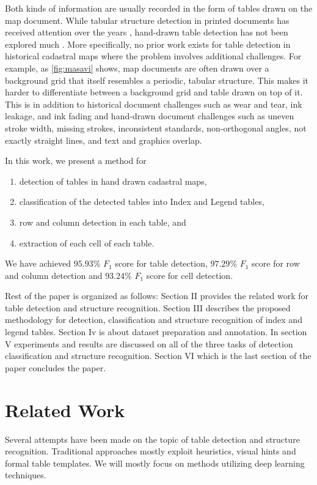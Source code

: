 Both kinds of information are usually recorded in the form of tables drawn on the map document. While tabular structure detection in printed documents has received attention over the years \cite{paliwal2019tablenet,qasim2019rethinking,khan2019table,kavasidis2019saliency,siddiqui2018decnt,arif2018table,schreiber2017deepdesrt,he2017multi,gilani2017table,shigarov2016configurable,kasar2015table,kasar2013learning,wang2004table,wangt2001automatic,kieninger1998t}, hand-drawn table detection has not been explored much \cite{ghanmi2014table,chen2012model,chen2011table}. More specifically, no prior work exists for table detection in historical cadastral maps where the problem involves additional challenges. For example, as \autoref{fig:masavi} shows, map documents are often drawn over a background grid that itself resembles a periodic, tabular structure. This makes  it harder to differentiate between a background grid and table drawn on top of it. This is in addition to historical document challenges such as wear and tear, ink leakage, and ink fading and hand-drawn document challenges such as uneven stroke width, missing strokes, inconsistent standards, non-orthogonal angles, not exactly straight lines, and text and graphics overlap.

In this work, we present a method for
\begin{enumerate}
      \item detection of tables in hand drawn cadastral maps,
      \item classification of the detected tables into Index and Legend tables,
      \item row and column detection in each table, and
      \item extraction of each cell of each table. 
\end{enumerate}
We have achieved $95.93\%$ $F_1$ score for table detection, $97.29\%$ $F_1$ score for row and column detection and $93.24\%$ $F_1$ score for cell detection.

Rest of the paper is organized as follows: Section II provides the related work for table detection and structure recognition. Section III describes the proposed methodology for detection, classification and structure recognition of index and legend tables. Section Iv is about dataset preparation and annotation. In section V experiments and results are discussed on all of the three tasks of detection classification and structure recognition. Section VI which is the last section of the paper concludes the paper.
\section{Related Work}
\label{sec:relatedWork}
Several attempts have been made on the topic of table detection and structure recognition. Traditional approaches mostly exploit heuristics, visual hints and formal table templates. We will mostly focus on methods utilizing deep learning techniques. 
